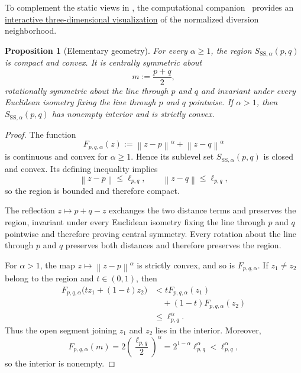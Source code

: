 \documentclass[a4paper,fleqn]{cas-dc}
\newtheorem{proposition}{Proposition}
\theoremstyle{definition}
\theoremstyle{remark}
\newcommand{\norm}[1]{\left\lVert #1\right\rVert}
\newcommand{\ellpq}{\ell_{p,q}}
\newcommand{\0}{\mathbf{0}}
\begin{document}
To complement the static views in , the computational
companion~\citep{espino2026computational} provides an
\href{https://heri-espino.github.io/Stepping-Stone-Volume-Constants/}
{interactive three-dimensional visualization} of the normalized diversion
neighborhood. 

\begin{proposition}[Elementary geometry]\label{prop:geometry}
For every $\alpha\geq1$, the region $S_{\mathrm{SS},\alpha}(p,q)$ is compact
and convex. It is centrally symmetric about
\begin{equation}
    m:=\frac{p+q}{2},
\end{equation}
rotationally symmetric about the line through $p$ and $q$ 
and invariant under every Euclidean isometry fixing the line through
$p$ and $q$ pointwise. If
$\alpha>1$, then $S_{\mathrm{SS},\alpha}(p,q)$ has nonempty interior and is
strictly convex.
\end{proposition}

\begin{proof}
The function
\begin{equation}
    F_{p,q,\alpha}(z)
    :=\norm{z-p}^{\alpha}+\norm{z-q}^{\alpha}
\end{equation}
is continuous and convex for $\alpha\geq1$. Hence its sublevel set
$S_{\mathrm{SS},\alpha}(p,q)$ is closed and convex. Its defining inequality
implies
\begin{equation}
    \norm{z-p}\leq\ellpq,
    \qquad
    \norm{z-q}\leq\ellpq,
\end{equation}
so the region is bounded and therefore compact.

The reflection $z\mapsto p+q-z$ exchanges the two distance terms and preserves
the region, invariant under every Euclidean isometry fixing the line through
$p$ and $q$ pointwise and therefore proving central symmetry.
Every rotation about the line through
$p$ and $q$ preserves both distances and therefore preserves the region.

For $\alpha>1$, the map $z\mapsto\norm{z-p}^{\alpha}$ is strictly convex, and
so is $F_{p,q,\alpha}$. If $z_1\neq z_2$ belong to the region and
$t\in(0,1)$, then
\begin{equation}
\begin{aligned}
F_{p,q,\alpha}\bigl(tz_1+(1-t)z_2\bigr)
&<
tF_{p,q,\alpha}(z_1)
\\
&\quad
+(1-t)F_{p,q,\alpha}(z_2)
\\
&\leq \ellpq^\alpha.
\end{aligned}
\end{equation}
Thus the open segment joining $z_1$ and $z_2$ lies in the interior. Moreover,
\begin{equation}
    F_{p,q,\alpha}(m)
    =2\left(\frac{\ellpq}{2}\right)^{\alpha}
    =2^{1-\alpha}\ellpq^{\alpha}
    <\ellpq^{\alpha},
\end{equation}
so the interior is nonempty.
\end{proof}
\end{document}
